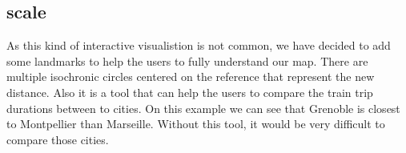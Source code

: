 \subsection{scale}
As this kind of interactive visualistion is not common, we have decided to add some landmarks to help the users to fully understand our map. There are multiple isochronic circles centered on the reference that represent the new distance. Also it is a tool that can help the users to compare the train trip durations between to cities.
On this example we can see that Grenoble is closest to Montpellier than Marseille. Without this tool, it would be very difficult to compare those cities.


